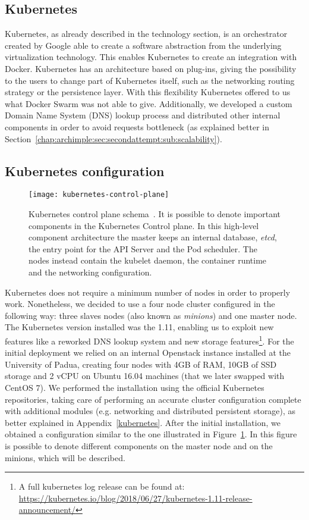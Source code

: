 \subsection{Kubernetes}
Kubernetes, as already described in the technology section, is an orchestrator
created by Google able to create a software abstraction from the underlying
virtualization technology. This enables Kubernetes to create an integration with
Docker. Kubernetes has an architecture based on plug-ins, giving the possibility
to the users to change part of Kubernetes itself, such as the networking routing
strategy or the persistence layer. With this flexibility Kubernetes offered to
us what Docker Swarm was not able to give. Additionally, we developed a custom
Domain Name System (DNS) lookup process and distributed other internal
components in order to avoid requests bottleneck (as explained better in
Section~\ref{chap:archimple:sec:secondattempt:sub:scalability}).

\subsection{Kubernetes configuration}
\label{chap:archimpl:sec:secondattempt:sec:k8s}
\begin{figure}[t]
  \centering
  \texttt{[image: kubernetes-control-plane]}
  \caption[Kubernetes control plane schema]{Kubernetes control plane
    schema~\cite{k8scp}. It is possible to denote important components in the
    Kubernetes Control plane. In this high-level component architecture the
    master keeps an internal database, \emph{etcd}, the entry point for the API
    Server and the Pod scheduler. The nodes instead contain the kubelet daemon,
    the container runtime and the networking configuration.}
  \label{chap:archimpl:sec:secondattempt:img:k8scp}
\end{figure}

Kubernetes does not require a minimum number of nodes in order to properly work.
Nonetheless, we decided to use a four node cluster configured in the following
way: three slaves nodes (also known as \emph{minions}) and one master node. The
Kubernetes version installed was the 1.11, enabling us to exploit new features
like a reworked DNS lookup system and new storage features\footnote{A full
  kubernetes log release can be found at:
  \url{https://kubernetes.io/blog/2018/06/27/kubernetes-1.11-release-announcement/}}.
For the initial deployment we relied on an internal Openstack instance installed
at the University of Padua, creating four nodes with 4GB of RAM, 10GB of SSD
storage and 2 vCPU on Ubuntu 16.04 machines (that we later swapped with CentOS
7). We performed the installation using the official Kubernetes repositories,
taking care of performing an accurate cluster configuration complete with
additional modules (e.g. networking and distributed persistent storage), as
better explained in Appendix~\ref{kubernetes}. After the initial installation,
we obtained a configuration similar to the one illustrated in
Figure~\ref{chap:archimpl:sec:secondattempt:img:k8scp}. In this figure is
possible to denote different components on the master node and on the minions,
which will be described.

